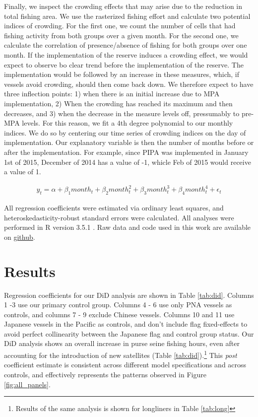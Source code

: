 \documentclass[9pttwoside,lineno]{pnas-new}
\begin{document}
Finally, we inspect the crowding effects that may arise due to the reduction
in total fishing area. We use the rasterized fishing effort and calculate two
potential indices of crowding. For the first one, we count the number of cells
that had fishing activity from both groups over a given month. For the second one,
we calculate the correlation of presence/absence of fishing for both groups
over one month. If the implementation of the reserve induces a crowding effect,
we would expect to observe bo clear trend before the implementation of the reserve.
The implementation would be followed by an increase in these measures, which, 
if vessels avoid crowding, should then come back down. We therefore expect to
have three inflection points: 1) when there is an initial increase due to MPA
implementation, 2) When the crowding has reached its maximum and then decreases,
and 3) when the decrease in the measure levels off, pressumably to pre-MPA levels.
For this reason, we fit a 4th degree polynomial to our monthly indices. We do so by
centering our time series of crowding indices on the day of implementation. Our
explanatory variable is then the number of months before or after the implementation.
For example, since PIPA was implemented in January 1st of 2015, December of 2014 
has a value of -1, whicle Feb of 2015 would receive a value of 1.

\begin{figure}[h]
\begin{align*}
y_t = \alpha + \beta_1 month_t + \beta_2 month_t^2 + \beta_3 month_t^3 + \beta_4 month_t ^4 + \epsilon_t
\end{align*}
\end{figure}

All regression coefficients were estimated via ordinary least squares,
and heteroskedasticity-robust standard errors were calculated. All analyses
were performed in R version 3.5.1 \citep{rcore_2018}. Raw data and code
used in this work are available on
\href{https://github.com/jcvdav/MPA_displacement}{github}.

\section{Results}\label{results}

Regression coefficients for our DiD analysis are shown in Table
\ref{tab:did}. Columns 1 -3 use our primary control group. Columns 4 - 6 use
only PNA vessels as controls, and columns 7 - 9 exclude Chinese vessels.
Columns 10 and 11 use Japanese vessels in the Pacific as controls, and
don't include flag fixed-effects to avoid perfect collinearity
between the Japanese flag and
control group status.
Our DiD analysis shows an overall increase in purse seine fishing hours,
even after accounting for the introduction of new satellites (Table
\ref{tab:did}).\footnote{Results of the same analysis is shown for longliners in Table \ref{tab:long}} This 
\emph{post} coefficient estimate is consistent across different
model specifications and across controls, and
effectively represents the patterns observed in Figure
\ref{fig:all_panels}.
\end{document}
